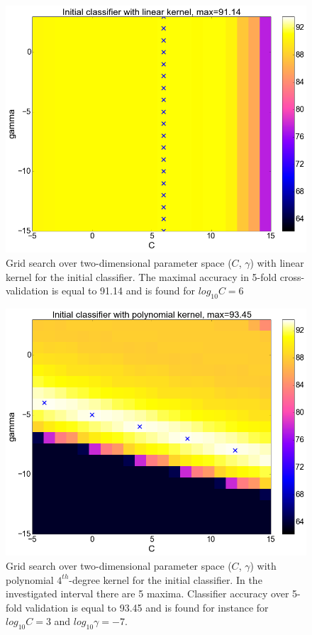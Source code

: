 \begin{center}
\begin{figure}
	\centering
  \includegraphics[width=1\textwidth]{plots/init_linear}
  \caption{Grid search over two-dimensional parameter space ($C$, $\gamma$) with linear kernel for the initial classifier. The maximal accuracy in 5-fold cross-validation is equal to 91.14 and is found for $log_{10}C=6$}
  \label{fig:initial_linear}
\end{figure}
\begin{figure}
\centering
  \includegraphics[width=1\textwidth]{plots/init_poly}
  \caption{Grid search over two-dimensional parameter space ($C$, $\gamma$) with polynomial $4^{th}$-degree kernel for the initial classifier. In the investigated interval there are 5 maxima. Classifier accuracy over 5-fold validation is equal to 93.45 and is found for instance for $log_{10}C=3$ and $log_{10}\gamma=-7$.}
  \label{fig:initial_poly}
\end{figure}


\end{center}
